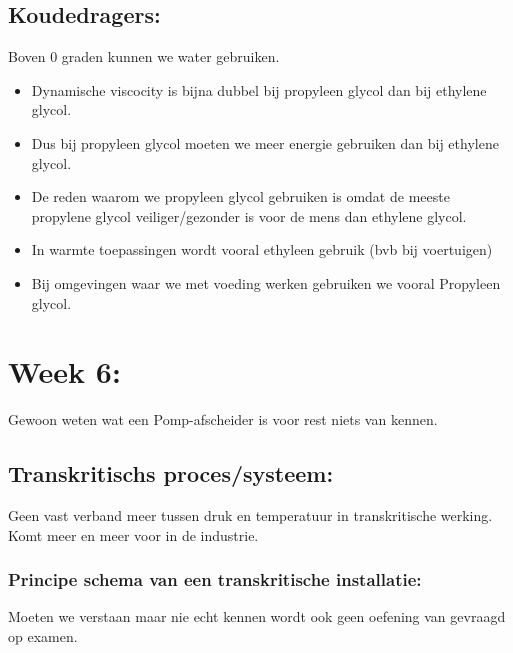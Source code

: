 \documentclass[12pt]{article}
\begin{document}
\subsection{Koudedragers:}
Boven 0 graden kunnen we water gebruiken.\begin{itemize}
    \item Dynamische viscocity is bijna dubbel bij propyleen glycol dan bij ethylene glycol.
    \item Dus bij propyleen glycol moeten we meer energie gebruiken dan bij ethylene glycol.
    \item De reden waarom we propyleen glycol gebruiken is omdat de meeste propylene glycol veiliger/gezonder is voor de mens dan ethylene glycol.
    \item In warmte toepassingen wordt vooral ethyleen gebruik (bvb bij voertuigen)
    \item Bij omgevingen waar we met voeding werken gebruiken we vooral Propyleen glycol.
\end{itemize}
\section{Week 6:}
Gewoon weten wat een Pomp-afscheider is voor rest niets van kennen.
\subsection{Transkritischs proces/systeem:}
Geen vast verband meer tussen druk en temperatuur in transkritische werking. Komt meer en meer voor in de industrie.
\subsubsection{Principe schema van een transkritische installatie:}
Moeten we verstaan maar nie echt kennen wordt ook geen oefening van gevraagd op examen.
\end{document}
